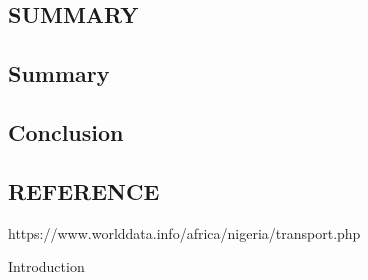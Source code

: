 \documentclass{article}
\begin{document}
\newpage

\begin{center}
	\section{SUMMARY}
\end{center}
\subsection{Summary}
\subsection{Conclusion}

\newpage

\begin{center}
	\section{REFERENCE}
\end{center}

 https://www.worlddata.info/africa/nigeria/transport.php
 
 Introduction
\end{document}

